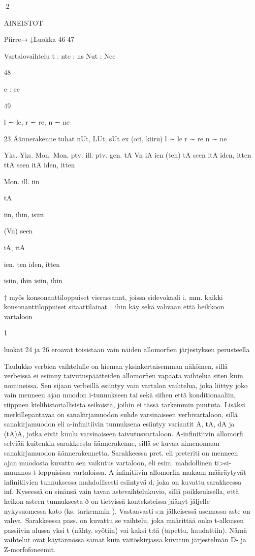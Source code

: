 \documentclass[free]{flammie}
\begin{document}
\begin{table}
2

AINEISTOT

Piirre→
↓Luokka
46
47

Vartalovaihtelu
t : nte :
ns
Nut : Nee

48

e : ee

49

l ∼ le,
r ∼ re,
n ∼ ne

23
Äännerakenne
tuhat
nUt, LUt,
sUt
ex
(ori,
kiiru)
l ∼ le
r ∼ re
n ∼ ne

Yks. Yks. Mon. Mon.
ptv. ill.
ptv.
gen.
tA
Vn
iA
ien
(ten)
tA
seen itA
iden,
itten
ttA
seen itA
iden,
itten

Mon.
ill.
iin

tA

iin,
ihin,
isiin

(Vn)
seen

iA,
itA

ien, ten
iden,
itten

isiin,
ihin
isiin,
ihin

† myös konsonanttiloppuiset vierassanat, joissa sidevokaali i, mm. kaikki
konsonanttiloppuiset sitaattilainat
‡ ihin käy sekä vahvaan että heikkoon vartaloon

1

luokat 24 ja 26 eroavat toisistaan vain näiden allomorfien järjestyksen perusteella
\end{table}

Taulukko verbien vaihtelulle on hieman yksinkertaisemman näköinen, sillä verbeissä ei esiinny taivutuspäätteiden allomorfien vapaata vaihtelua siten kuin nomineissa. Sen sijaan verbeillä esiintyy vain vartalon vaihtelua, joka liittyy joko
vain menneen ajan muodon i-tunnukseen tai sekä siihen että konditionaaliin, riippuen kielihistoriallisista seikoista, joihin ei tässä tarkemmin puututa. Lisäksi merkillepantavaa on sanakirjamuodon suhde varsinaiseen verbivartaloon, sillä sanakirjamuodon eli a-infinitiivin tunnuksena esiintyy variantit A, tA, dA ja (tA)A, jotka eivät kuulu varsinaiseen taivutusvartaloon. A-infinitiivin allomorfi selviää kuitenkin sarakkeesta äännerakenne, sillä se kuvaa nimenomaan sanakirjamuodon
äännerakennetta. Sarakkeessa pret. eli preteriti on menneen ajan muodosta kuvattu sen vaikutus vartaloon, eli esim. mahdollinen ti>si-muunnos t-loppuisissa
vartaloissa. A-infinitiivin allomorfin mukaan määräytyvät infinitiivien tunnuksessa mahdollisesti esiintyvä d, joka on kuvattu sarakkeessa inf. Kyseessä on sinänsä
vain tavan astevaihtelukuvio, sillä poikkeuksella, että heikon asteen tunnuksesta
ð on tietyissä konteksteissa jäänyt jäljelle nykysuomessa kato (ks. tarkemmin
\cite{hakulinen1970suomen}). Vastaavasti s:n jälkeisessä asemassa aste on vahva. Sarakkeessa
pass. on kuvattu se vaihtelu, joka määrittää onko t-alkuisen passiivin alussa yksi
t (nähty, syötiin) vai kaksi t:tä (tapettu, haudattiin). Nämä vaihtelut ovat käytännössä samat kuin väitöskirjassa \cite{koskenniemi1983twolevel} kuvatun järjestelmän D- ja
Z-morfofoneemit.
\end{document}
